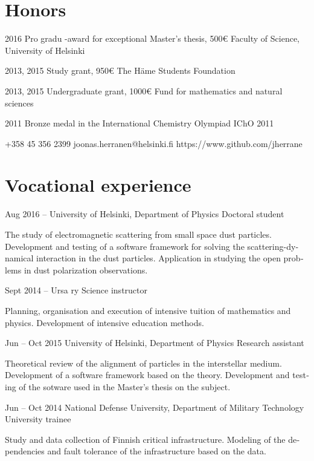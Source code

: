 \documentclass{tccv}
\begin{document}
\begin{otherlanguage}{english}
\section{Honors}
\begin{yearlist}
	\item{2016}
	{Pro gradu -award for exceptional Master's thesis, 500€}
	{Faculty of Science, University of Helsinki}
	\item{2013, 2015}
	{Study grant, 950€}
	{The Häme Students Foundation}	
	\item{2013, 2015}
	{Undergraduate grant, 1000€}
	{Fund for mathematics and natural sciences}	
	\item{2011}
	{Bronze medal in the International Chemistry Olympiad}
	{IChO 2011}	
\end{yearlist}

{+358 45 356 2399}
{joonas.herranen@helsinki.fi}
{https://www.github.com/jherrane}

\section{Vocational experience}
\begin{eventlist}	
	\item{Aug 2016 -- }
	{University of Helsinki, Department of Physics}
	{Doctoral student}
	
	The study of electromagnetic scattering from small space dust particles. Development and testing of a software framework for solving the scattering-dynamical interaction in the dust particles. Application in studying the open problems in dust polarization observations.
	
	\item{Sept 2014 --}
	{Ursa ry}
	{Science instructor}
	
	Planning, organisation and execution of intensive tuition of mathematics and physics. Development of intensive education methods.
	
	\item{Jun -- Oct 2015}
	{University of Helsinki, Department of Physics}
	{Research assistant}
	
	Theoretical review of the alignment of particles in the interstellar medium. Development of a software framework based on the theory. Development and testing of the sotware used in the Master's thesis on the subject.
	
	\item{Jun -- Oct 2014}
	{National Defense University, \hspace*{2in} \linebreak
	Department of Military Technology}
	{University trainee}
	
	Study and data collection of Finnish critical infrastructure. Modeling of the dependencies and fault tolerance of the infrastructure based on the data.
	
\end{eventlist}
\end{otherlanguage}
\end{document}
